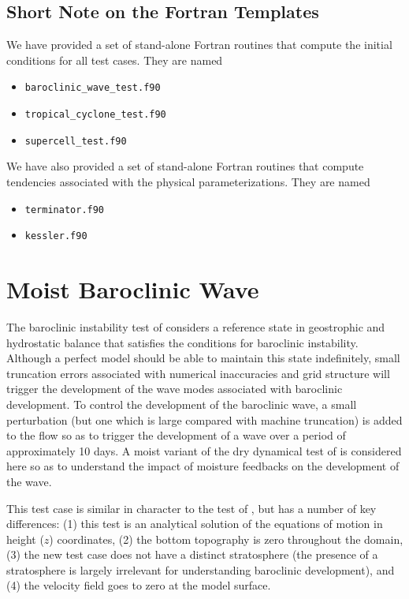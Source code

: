 \documentclass[times,doublespace]{fldauth}
\begin{document}
\subsection{Short Note on the Fortran Templates}
\label{sec:template}
We have provided a set of stand-alone Fortran routines that compute the initial conditions for all test cases. They are named

\begin{itemize}
\item \texttt{baroclinic\_wave\_test.f90}
\item \texttt{tropical\_cyclone\_test.f90}
\item \texttt{supercell\_test.f90}
\end{itemize}

We have also provided a set of stand-alone Fortran routines that compute tendencies associated with the physical parameterizations.  They are named

\begin{itemize}
\item \texttt{terminator.f90}
\item \texttt{kessler.f90}
\end{itemize}


\clearpage
\section{Moist Baroclinic Wave} \label{sec:baroclinic_wave}
 
The baroclinic instability test of \cite{ullrich2014proposed} considers a reference state in geostrophic and hydrostatic balance that satisfies the conditions for baroclinic instability.  Although a perfect model should be able to maintain this state indefinitely, small truncation errors associated with numerical inaccuracies and grid structure will trigger the development of the wave modes associated with baroclinic development.  To control the development of the baroclinic wave, a small perturbation (but one which is large compared with machine truncation) is added to the flow so as to trigger the development of a wave over a period of approximately 10 days.  A moist variant of the dry dynamical test of \cite{ullrich2014proposed} is considered here so as to understand the impact of moisture feedbacks on the development of the wave.

This test case is similar in character to the test of \cite{jablonowski2006baroclinic}, but has a number of key differences:  (1) this test is an analytical solution of the equations of motion in height ($z$) coordinates, (2) the bottom topography is zero throughout the domain, (3) the new test case does not have a distinct stratosphere (the presence of a stratosphere is largely irrelevant for understanding baroclinic development), and (4) the velocity field goes to zero at the model surface.
 
\end{document}
